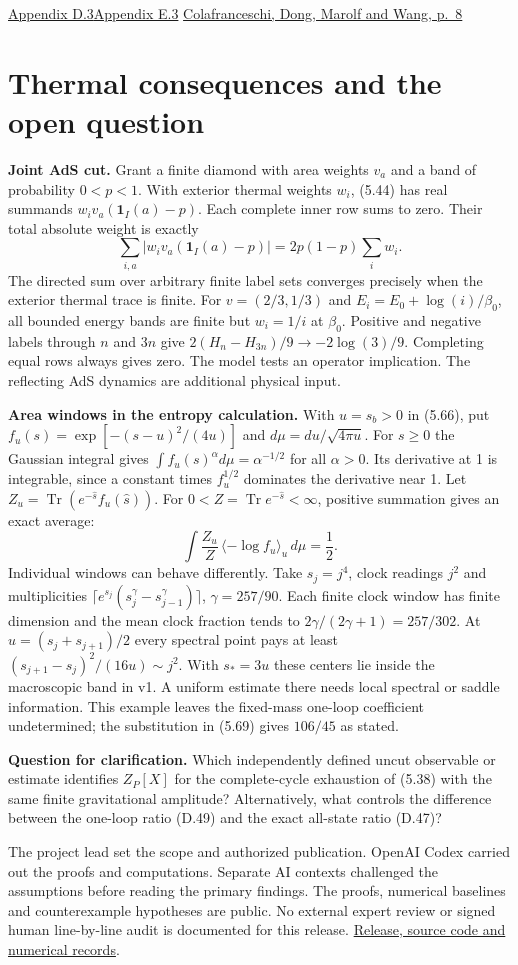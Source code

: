 \documentclass[12pt,a4paper]{article}
\newcommand{\topic}[1]{\section*{\color{ink}#1}}
\DeclareMathOperator{\Tr}{Tr}
\newcommand{\paper}[2]{\href{https://arxiv.org/html/2611.34924v1\##1}{#2}}
\newcommand{\release}{\href{https://github.com/SHIN09-git/null-cone-quantum-gravity-verification/releases/tag/v0.2.0}{Release, source code and numerical records}}
\begin{document}
{\small\paper{A4.SS3}{Appendix D.3}\quad\paper{A5.SS3}{Appendix E.3}\quad
\href{https://arxiv.org/pdf/2310.02189v3\#page=9}{Colafranceschi, Dong, Marolf and Wang, p.~8}}

\clearpage
\topic{Thermal consequences and the open question}

\textbf{Joint AdS cut.} Grant a finite diamond with area weights $v_a$ and a band of probability $0<p<1$. With exterior thermal weights $w_i$, (5.44) has real summands $w_i v_a(\mathbf1_I(a)-p)$. Each complete inner row sums to zero. Their total absolute weight is exactly
\[
 \sum_{i,a}|w_i v_a(\mathbf1_I(a)-p)|=2p(1-p)\sum_i w_i.
\]
The directed sum over arbitrary finite label sets converges precisely when the exterior thermal trace is finite. For $v=(2/3,1/3)$ and $E_i=E_0+\log(i)/\beta_0$, all bounded energy bands are finite but $w_i=1/i$ at $\beta_0$. Positive and negative labels through $n$ and $3n$ give $2(H_n-H_{3n})/9\to-2\log(3)/9$. Completing equal rows always gives zero. The model tests an operator implication. The reflecting AdS dynamics are additional physical input.

\textbf{Area windows in the entropy calculation.} With $u=s_b>0$ in (5.66), put $f_u(s)=\exp[-(s-u)^2/(4u)]$ and $d\mu=du/\sqrt{4\pi u}$. For $s\ge0$ the Gaussian integral gives $\int f_u(s)^\alpha d\mu=\alpha^{-1/2}$ for all $\alpha>0$. Its derivative at 1 is integrable, since a constant times $f_u^{1/2}$ dominates the derivative near 1. Let $Z_u=\Tr(e^{-\hat s}f_u(\hat s))$. For $0<Z=\Tr e^{-\hat s}<\infty$, positive summation gives an exact average:
\[
 \int \frac{Z_u}{Z}\,\langle-\log f_u\rangle_u\,d\mu=\frac12 .
\]
Individual windows can behave differently. Take $s_j=j^4$, clock readings $j^2$ and multiplicities $\lceil e^{s_j}(s_j^\gamma-s_{j-1}^\gamma)\rceil$, $\gamma=257/90$. Each finite clock window has finite dimension and the mean clock fraction tends to $2\gamma/(2\gamma+1)=257/302$. At $u=(s_j+s_{j+1})/2$ every spectral point pays at least $(s_{j+1}-s_j)^2/(16u)\sim j^2$. With $s_*=3u$ these centers lie inside the macroscopic band in v1. A uniform estimate there needs local spectral or saddle information. This example leaves the fixed-mass one-loop coefficient undetermined; the substitution in (5.69) gives $106/45$ as stated.

\textbf{Question for clarification.} Which independently defined uncut observable or estimate identifies $Z_P[X]$ for the complete-cycle exhaustion of (5.38) with the same finite gravitational amplitude? Alternatively, what controls the difference between the one-loop ratio (D.49) and the exact all-state ratio (D.47)?

{\small The project lead set the scope and authorized publication. OpenAI Codex carried out the proofs and computations. Separate AI contexts challenged the assumptions before reading the primary findings. The proofs, numerical baselines and counterexample hypotheses are public. No external expert review or signed human line-by-line audit is documented for this release. \release.}
\end{document}
